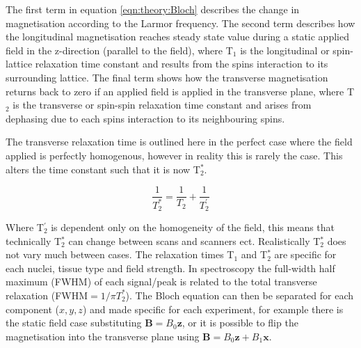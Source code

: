 \documentclass[class=article, crop=false]{standalone}
\begin{document}
The first term in equation \ref{eqn:theory:Bloch} describes the change in magnetisation according to the Larmor frequency. The second term describes how the longitudinal magnetisation reaches steady state value during a static applied field in the z-direction (parallel to the field), where T$_1$ is the longitudinal or spin-lattice relaxation time constant and results from the spins interaction to its surrounding lattice. The final term shows how the transverse magnetisation returns back to zero if an applied field is applied in the transverse plane, where T$_2$ is the transverse or spin-spin relaxation time constant and arises from dephasing due to each spins interaction to its neighbouring spins. 

The transverse relaxation time is outlined here in the perfect case where the field applied is perfectly homogenous, however in reality this is rarely the case. This alters the time constant such that it is now T$_2^*$.

\begin{equation}
    \frac{1}{T_2^*} = \frac{1}{T_2} + \frac{1}{T_2^{'}}
    \label{eqn:theory:trans}
\end{equation}

Where T$_2^{'}$ is dependent only on the homogeneity of the field, this means that technically T$_2^*$ can change between scans and scanners ect. Realistically T$_2^*$ does not vary much between cases. The relaxation times T$_1$ and T$_2^*$ are specific for each nuclei, tissue type and field strength. In spectroscopy the full-width half maximum (FWHM) of each signal/peak is related to the total transverse relaxation (FWHM$ = 1 / \pi T_2^*$). The Bloch equation can then be separated for each component ($x,y,z$) and made specific for each experiment, for example there is the static field case substituting $\mathbf{B}=B_0\mathbf{z}$, or it is possible to flip the magnetisation into the transverse plane using $\mathbf{B}=B_0\mathbf{z}+B_1\mathbf{x}$. 
\end{document}
